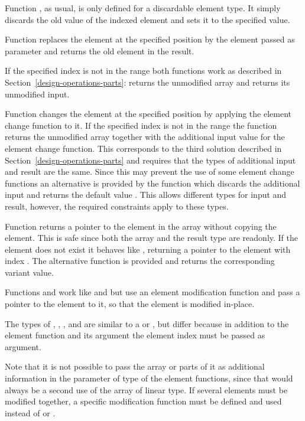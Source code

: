 Function , as usual, is only defined for a discardable element type. 
It simply discards the old value of the indexed element and sets it to the specified value.

Function 
replaces the element at the specified position by the element passed as parameter and returns the old element in the result.

If the specified
index is not in the range  both functions work as described in Section~\ref{design-operations-parts}:
 returns the unmodified array and  returns its unmodified input.

Function  changes the element at the specified position by applying the element change function
to it. If the specified
index is not in the range  the function returns the unmodified array together with the additional input
value for the element change function. This corresponds to the third solution described in Section~\ref{design-operations-parts}
and requires that the types of additional input and result are the same. Since this may prevent the use of some element
change functions an alternative is provided by the function  which discards the additional
input and returns the default value . This allows different types for input and result, however,
the required constraints apply to these types.

Function  returns a pointer to the element in the array without copying the element. This is safe since 
both the array and the result type are readonly. If the element does not exist it behaves like , returning 
a pointer to the element with index . The alternative function  is provided and returns the 
corresponding variant value.

Functions  and  work like  and  but use an
element modification function and pass a pointer to the element to it, so that the element is modified in-place.

The types of , , , and  are similar to a 
 or , but differ because in addition to the 
element function and its argument the element index must be passed as argument.

Note that it is not possible
to pass the array or parts of it as additional information in the parameter of type  of the element
functions, since that would always be
a second use of the array of linear type. If several elements must be modified together, a specific modification function
must be defined and used instead of  or .

